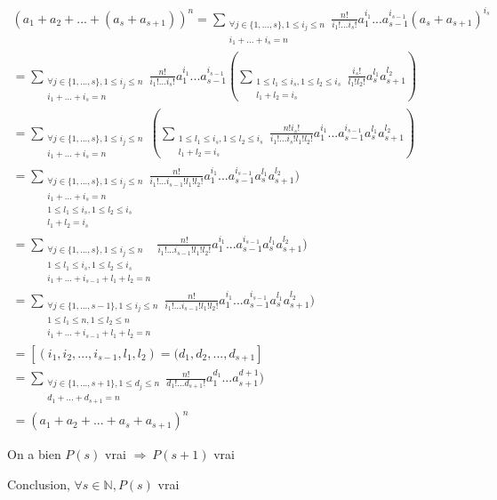 \begin{multline*}
(a_1 + a_2 + ... + (a_s + a_{s+1}))^n = \sum_{\substack{\forall j \in \{1, ..., s\}, 1 \leq i_j \leq n \\ i_1 + ... + i_s = n}} \frac{n!}{i_1!...i_s!}a_1^{i_1}...a_{s-1}^{i_{s-1}}(a_s + a_{s+1})^{i_s} \\
= \sum_{\substack{\forall j \in \{1, ..., s\}, 1 \leq i_j \leq n \\ i_1 + ... + i_s = n}} \frac{n!}{i_1!...i_s!}a_1^{i_1}...a_{s-1}^{i_{s-1}}(\sum_{\substack{1 \leq l_1 \leq i_s, 1 \leq l_2 \leq i_s  \\ l_1 + l_2 = i_s}} \frac{i_s!}{l_1!l_2!}a_s^{l_1}a_{s+1}^{l_2}) \\
= \sum_{\substack{\forall j \in \{1, ..., s\}, 1 \leq i_j \leq n \\ i_1 + ... + i_s = n}} (\sum_{\substack{1 \leq l_1 \leq i_s, 1 \leq l_2 \leq i_s  \\ l_1 + l_2 = i_s}} \frac{n!i_s!}{i_1!...i_s!l_1!l_2!}a_1^{i_1}...a_{s-1}^{i_{s-1}}a_s^{l_1}a_{s+1}^{l_2}) \\
= \sum_{\substack{\forall j \in \{1, ..., s\}, 1 \leq i_j \leq n \\ i_1 + ... + i_s = n \\ 1 \leq l_1 \leq i_s, 1 \leq l_2 \leq i_s  \\ l_1 + l_2 = i_s}} \frac{n!}{i_1!...i_{s-1}!l_1!l_2!}a_1^{i_1}...a_{s-1}^{i_{s-1}}a_s^{l_1}a_{s+1}^{l_2}) \\
= \sum_{\substack{\forall j \in \{1, ..., s\}, 1 \leq i_j \leq n\\ 1 \leq l_1 \leq i_s, 1 \leq l_2 \leq i_s  \\ i_1 + ... + i_{s-1} + l_1 + l_2 = n}} \frac{n!}{i_1!...i_{s-1}!l_1!l_2!}a_1^{i_1}...a_{s-1}^{i_{s-1}}a_s^{l_1}a_{s+1}^{l_2}) \\
= \sum_{\substack{\forall j \in \{1, ..., s - 1\}, 1 \leq i_j \leq n\\ 1 \leq l_1 \leq n, 1 \leq l_2 \leq n  \\ i_1 + ... + i_{s-1} + l_1 + l_2 = n}} \frac{n!}{i_1!...i_{s-1}!l_1!l_2!}a_1^{i_1}...a_{s-1}^{i_{s-1}}a_s^{l_1}a_{s+1}^{l_2}) \\
= [(i_1, i_2, ..., i_{s-1}, l_1, l_2) = (d_1, d_2, ..., d_{s+1}] \\
= \sum_{\substack{\forall j \in \{1, ..., s + 1\}, 1 \leq d_j \leq n \\ d_1 + ... + d_{s+1} = n}} \frac{n!}{d_1!...d_{s+1}!}a_1^{d_1}...a_{s+1}^{d+1}) \\
= (a_1 + a_2 + ... + a_s + a_{s+1})^n
\end{multline*}


On a bien $P(s)$ vrai $\Longrightarrow\ P(s+1)$ vrai

Conclusion, $\forall s \in \mathbb{N}, P(s)$ vrai
